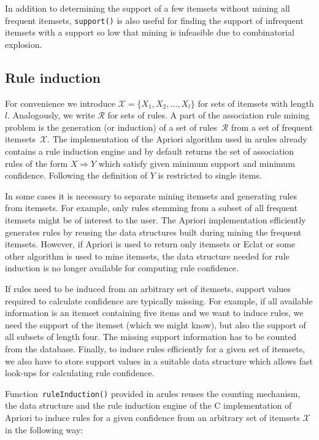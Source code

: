 \documentclass[10pt,a4paper]{article}
\newcommand{\strong}[1]{{\normalfont\fontseries{b}\selectfont #1}}
\newcommand{\func}[1]{\mbox{\texttt{#1()}}}
\newcommand{\pkg}[1]{\strong{#1}}
\newcommand{\proglang}[1]{\textsf{#1}}
\newcommand{\set}[1]{\mathcal{#1}}
\begin{document}
In addition to determining the support of a few itemsets without mining all
frequent itemsets, \func{support} is also useful for finding 
the support of infrequent itemsets with a support so low that mining
is infeasible due to combinatorial explosion.


\subsection{Rule induction\label{sec:induction}}

For convenience we introduce $\set{X} = \{X_1, X_2, \ldots, X_l\}$ for
sets of itemsets with length $l$.  Analogously, we write $\set{R}$ for
sets of rules.  A part of the association rule mining problem is the
generation (or induction) of a set of rules~$\set{R}$ from a set of
frequent itemsets~$\set{X}$.  The implementation of the Apriori
algorithm used in \pkg{arules} already contains a rule induction engine
and by default returns the set of association rules of the form $X
\Rightarrow Y$ which satisfy given minimum support and minimum
confidence.  Following the definition of
\cite{arules:Agrawal+Imielinski+Swami:1993} $Y$ is restricted to single
items.

In some cases it is necessary to separate mining itemsets and generating
rules from itemsets. For example, only rules stemming from a subset of
all frequent itemsets might be of interest to the user.  The Apriori
implementation efficiently generates rules by reusing the data
structures built during mining the frequent itemsets.  However, if
Apriori is used to return only itemsets or Eclat or some other algorithm
is used to mine itemsets, the data structure needed for rule induction
is no longer available for computing rule confidence.


If rules need to be induced from an arbitrary set of itemsets, support
values required to calculate confidence are typically missing.  For
example, if all available information is an itemset containing five
items and we want to induce rules, we need the support of the itemset
(which we might know), but also the support of all subsets of length
four. The missing support information has to be counted from the
database. Finally, to induce rules efficiently for a given set of
itemsets, we also have to store support values in a suitable data
structure which allows fast look-ups for calculating rule confidence.

Function~\func{ruleInduction} provided in \pkg{arules} reuses the
counting mechanism, the data structure and the rule induction engine of
the \proglang{C} implementation of Apriori to induce rules for a given
confidence from an arbitrary set of itemsets $\set{X}$ in the following
way:
\end{document}
